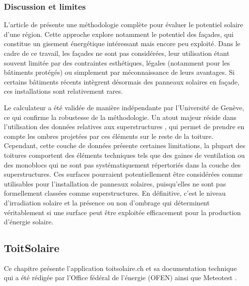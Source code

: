 \subsubsection{Discussion et limites}
\par{L'article de \citeauthor{desthieux_solar_2018} \cite{desthieux_solar_2018} présente une méthodologie complète pour évaluer le potentiel solaire d'une région. Cette approche explore notamment le potentiel des façades, qui constitue un gisement énergétique intéressant mais encore peu exploité. Dans le cadre de ce travail, les façades ne sont pas considérées, leur utilisation étant souvent limitée par des contraintes esthétiques, légales (notamment pour les bâtiments protégés) ou simplement par méconnaissance de leurs avantages. Si certains bâtiments récents intègrent désormais des panneaux solaires en façade, ces installations sont relativement rares.}
\par{Le calculateur a été validée de manière indépendante par l'Université de Genève, ce qui confirme la robustesse de la méthodologie. Un atout majeur réside dans l'utilisation des données relatives aux superstructures \cite{sitg_superstructures_nodate}, qui permet de prendre en compte les ombres projetées par ces éléments sur le reste de la toiture. Cependant, cette couche de données présente certaines limitations, la plupart des toitures comportent des éléments techniques tels que des gaines de ventilation ou des monoblocs qui ne sont pas systématiquement répertoriés dans la couche des superstructures. Ces surfaces pourraient potentiellement être considérées comme utilisables pour l'installation de panneaux solaires, puisqu'elles ne sont pas formellement classées comme superstructures. En définitive, c'est le niveau d'irradiation solaire et la présence ou non d'ombrage qui déterminent véritablement si une surface peut être exploitée efficacement pour la production d'énergie solaire.}

\subsection{ToitSolaire}

\par{Ce chapitre présente l'application toitsolaire.ch \cite{bfe_wie_nodate} et sa documentation technique \cite{klauser_energie_nodate} qui a été rédigée par l'Office fédéral de l'énergie (OFEN) ainsi que Meteotest \cite{meteotest_wir_2025}.}

